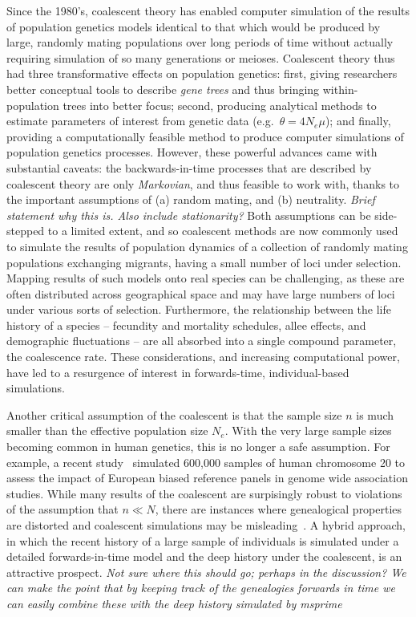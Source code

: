 \documentclass{article}
\newcommand{\plr}[1]{{\em \color{blue} #1}}
\newcommand{\jk}[1]{{\em \color{red} #1}}
\begin{document}
Since the 1980's, coalescent theory has enabled computer simulation of the results of population genetics models
identical to that which would be produced by large, randomly mating populations over long periods of time
without actually requiring simulation of so many generations or meioses.
Coalescent theory thus had three transformative effects on population genetics:
first, giving researchers better conceptual tools to describe \emph{gene trees} and thus bringing within-population trees into better focus;
second, producing analytical methods to estimate parameters of interest from genetic data (e.g.\ $\theta = 4N_e \mu$);
and finally, providing a computationally feasible method to produce computer simulations of population genetics processes.
However, these powerful advances came with substantial caveats:
the backwards-in-time processes that are described by coalescent theory
are only \emph{Markovian}, and thus feasible to work with,
thanks to the important assumptions of (a) random mating, and (b) neutrality.
\plr{Brief statement why this is.  Also include stationarity?}
Both assumptions can be side-stepped to a limited extent, and so coalescent methods are now commonly used to
simulate the results of population dynamics of a collection of randomly mating populations exchanging migrants,
having a small number of loci under selection.
Mapping results of such models onto real species can be challenging,
as these are often distributed across geographical space and may have large numbers of loci under various sorts of selection.
Furthermore, the relationship between the life history of a species --
fecundity and mortality schedules, allee effects, and demographic fluctuations --
are all absorbed into a single compound parameter, the coalescence rate.
These considerations, and increasing computational power, have led to a resurgence of interest in forwards-time, individual-based simulations.

Another critical assumption of the coalescent is that the sample size $n$ is much smaller
than the effective population size $N_e$. With the very large sample sizes becoming common
in human genetics, this is no longer a safe assumption. For example, a recent study~\citep{martin2017human}
simulated 600,000 samples of human chromosome 20 to assess the impact of European biased
reference panels in genome wide association studies. While many results of the coalescent are surpisingly
robust to violations of the assumption that $n \ll N$, there are instances where genealogical properties
are distorted and coalescent simulations may be
misleading~\citep{wakeley2003gene,maruvka2011recovering,bhaskar2014distortion}.
A hybrid approach, in which the recent history of a large sample of
individuals is simulated under a detailed forwards-in-time model and the deep history
under the coalescent, is an attractive prospect.
\jk{Not sure where this should go; perhaps in the discussion? We can make the point that
by keeping track of the genealogies forwards in time we can easily combine these with the
deep history simulated by msprime}
\end{document}
